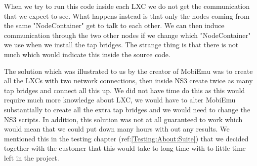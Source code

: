	When we try to run this code inside each \gls{LXC} we do not get the communication that we expect to see. What happens instead is that only the nodes coming from the same "NodeContainer" get to talk to each other. We can then induce communication through the two other nodes if we change which "NodeContainer" we use when we install the tap bridges. The strange thing is that there is not much which would indicate this inside the source code.
	
	The solution which was illustrated to us by the creator of MobiEmu was to create all the LXCs with two network connections, then inside NS3 create twice as many tap bridges and connect all this up. We did not have time do this as this would require much more knowledge about LXC, we would have to alter MobiEmu substantially to create all the extra tap bridges and we would need to change the NS3 scripts. In addition, this solution was not at all guaranteed to work which would mean that we could put down many hours with out any results. We mentioned this in the testing chapter (ref:\ref{Testing:About:Suite}) that we decided together with the customer that this would take to long time with to little time left in the project.

